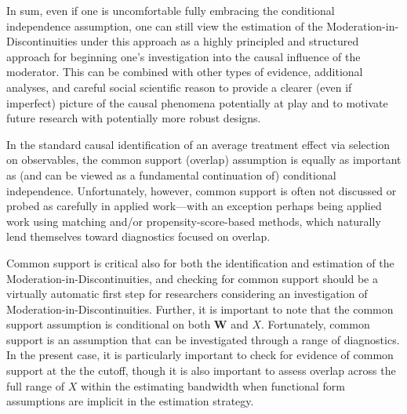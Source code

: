 \documentclass[12pt]{article}
\makeatletter
\renewcommand{\subsection}{\@startsection{subsection}{2}{0mm}{-\baselineskip}{0.25\baselineskip}{\raggedright\normalfont\normalsize\bf}}
\makeatother
\begin{document}
In sum, even if one is uncomfortable fully embracing the conditional independence assumption, one can still view the estimation of the Moderation-in-Discontinuities under this approach as a highly principled and structured approach for beginning one's investigation into the causal influence of the moderator. This can be combined with other types of evidence, additional analyses, and careful social scientific reason to provide a clearer (even if imperfect) picture of the causal phenomena potentially at play and to motivate future research with potentially more robust designs.






\subsection{Common Support}

In the standard causal identification of an average treatment effect via selection on observables, the common support (overlap) assumption is equally as important as (and can be viewed as a fundamental continuation of) conditional independence. Unfortunately, however, common support is often not discussed or probed as carefully in applied work---with an exception perhaps being applied work using matching and/or propensity-score-based methods, which naturally lend themselves toward diagnostics focused on overlap. 

Common support is critical also for both the identification and estimation of the Moderation-in-Discontinuities, and checking for common support should be a virtually automatic first step for researchers considering an investigation of Moderation-in-Discontinuities. Further, it is important to note that the common support assumption is conditional on both $\bm{W}$ and $X$. Fortunately, common support is an assumption that can be investigated through a range of diagnostics. In the present case, it is particularly important to check for evidence of common support at the the cutoff, though it is also important to assess overlap across the full range of $X$ within the estimating bandwidth when functional form assumptions are implicit in the estimation strategy.
\end{document}
